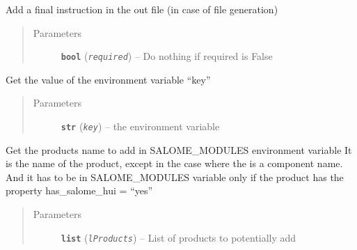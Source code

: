 \documentclass[a4paper,10pt,english]{sphinxmanual}
\begin{document}
\begin{fulllineitems}
\begin{fulllineitems}
\label{commands/apidoc/src:src.environment.SalomeEnviron.finish}
Add a final instruction in the out file (in case of file generation)
\begin{quote}\begin{description}
\item[{Parameters}] \leavevmode
\textbf{\texttt{bool}} (\emph{\texttt{required}}) -- Do nothing if required is False

\end{description}\end{quote}

\end{fulllineitems}


\begin{fulllineitems}
\label{commands/apidoc/src:src.environment.SalomeEnviron.get}
Get the value of the environment variable ``key''
\begin{quote}\begin{description}
\item[{Parameters}] \leavevmode
\textbf{\texttt{str}} (\emph{\texttt{key}}) -- the environment variable

\end{description}\end{quote}

\end{fulllineitems}


\begin{fulllineitems}
\label{commands/apidoc/src:src.environment.SalomeEnviron.get_names}
Get the products name to add in SALOME\_MODULES environment variable
It is the name of the product, except in the case where the is a 
component name. And it has to be in SALOME\_MODULES variable only 
if the product has the property has\_salome\_hui = ``yes''
\begin{quote}\begin{description}
\item[{Parameters}] \leavevmode
\textbf{\texttt{list}} (\emph{\texttt{lProducts}}) -- List of products to potentially add


\end{description}
\end{quote}
\end{fulllineitems}
\end{fulllineitems}
\end{document}
